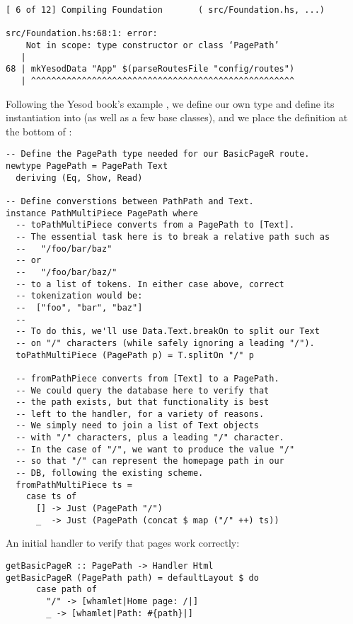 \begin{Verbatim}
[ 6 of 12] Compiling Foundation       ( src/Foundation.hs, ...)

src/Foundation.hs:68:1: error:
    Not in scope: type constructor or class ‘PagePath’
   |
68 | mkYesodData "App" $(parseRoutesFile "config/routes")
   | ^^^^^^^^^^^^^^^^^^^^^^^^^^^^^^^^^^^^^^^^^^^^^^^^^^^^

\end{Verbatim}

Following the Yesod book's example \cite{ybkRouting}, we define our own  type and define its instantiation into  (as well as a few base classes), and we place the definition at the bottom of :


\begin{Verbatim}
-- Define the PagePath type needed for our BasicPageR route.
newtype PagePath = PagePath Text
  deriving (Eq, Show, Read)

-- Define converstions between PathPath and Text.
instance PathMultiPiece PagePath where
  -- toPathMultiPiece converts from a PagePath to [Text].
  -- The essential task here is to break a relative path such as
  --   "/foo/bar/baz"
  -- or
  --   "/foo/bar/baz/"
  -- to a list of tokens. In either case above, correct
  -- tokenization would be:
  --  ["foo", "bar", "baz"]
  --
  -- To do this, we'll use Data.Text.breakOn to split our Text
  -- on "/" characters (while safely ignoring a leading "/").
  toPathMultiPiece (PagePath p) = T.splitOn "/" p

  -- fromPathPiece converts from [Text] to a PagePath.
  -- We could query the database here to verify that
  -- the path exists, but that functionality is best
  -- left to the handler, for a variety of reasons.
  -- We simply need to join a list of Text objects
  -- with "/" characters, plus a leading "/" character.
  -- In the case of "/", we want to produce the value "/"
  -- so that "/" can represent the homepage path in our
  -- DB, following the existing scheme.
  fromPathMultiPiece ts =
    case ts of
      [] -> Just (PagePath "/")
      _  -> Just (PagePath (concat $ map ("/" ++) ts))
\end{Verbatim}


An initial handler to verify that pages work correctly:

\begin{Verbatim}
getBasicPageR :: PagePath -> Handler Html
getBasicPageR (PagePath path) = defaultLayout $ do
      case path of
        "/" -> [whamlet|Home page: /|]
        _ -> [whamlet|Path: #{path}|]
\end{Verbatim}

